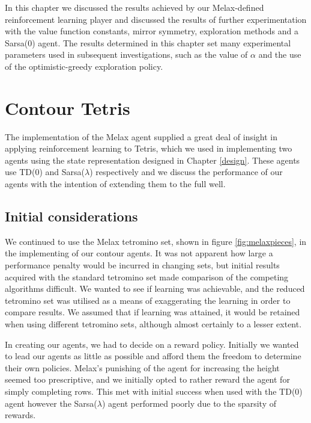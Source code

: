 \documentclass{rucsthesis}
\begin{document}
In this chapter we discussed the results achieved by our Melax-defined reinforcement learning player and discussed the results of further experimentation with the value function constants, mirror symmetry, exploration methods and a Sarsa(0) agent. The results determined in this chapter set many experimental parameters used in subsequent investigations, such as the value of $\alpha$ and the use of the optimistic-greedy exploration policy.

\chapter{Contour Tetris \label{chptcnt}}

The implementation of the Melax agent supplied a great deal of insight in applying reinforcement learning to Tetris, which we used in implementing two agents using the state representation designed in Chapter \ref{design}.  These agents use TD(0) and Sarsa($\lambda$) respectively and we discuss the performance of our agents with the intention of extending them to the full well.

\section{Initial considerations}

We continued to use the Melax tetromino set, shown in figure \ref{fig:melaxpieces}, in the implementing of our contour agents. It was not apparent how large a performance penalty would be incurred in changing sets, but initial results acquired with the standard tetromino set made comparison of the competing algorithms difficult. We wanted to see if learning was achievable, and the reduced tetromino set was utilised as a means of exaggerating the learning in order to compare results. We assumed that if learning was attained, it would be retained when using different tetromino sets, although almost certainly to a lesser extent. 

In creating our agents, we had to decide on a reward policy. Initially we wanted to lead our agents as little as possible and afford them the freedom to determine their own policies. Melax's punishing of the agent for increasing the height seemed too prescriptive, and we initially opted to rather reward the agent for simply completing rows. This met with initial success when used with the TD(0) agent however the Sarsa($\lambda$) agent performed poorly due to the sparsity of rewards.
\end{document}
